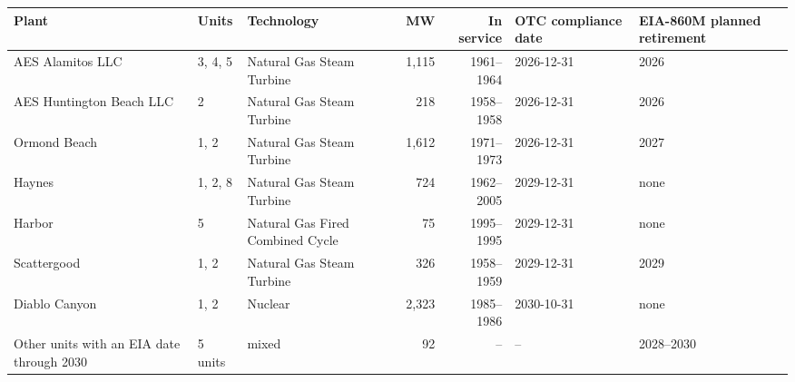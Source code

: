 \begin{tabular}{p{3.6cm}p{1.4cm}p{3.2cm}rrll}
\toprule
Plant & Units & Technology & MW & In service & OTC compliance date & EIA-860M planned retirement \\
\midrule
AES Alamitos LLC & 3, 4, 5 & Natural Gas Steam Turbine & 1,115 & 1961--1964 & 2026-12-31 & 2026 \\
AES Huntington Beach LLC & 2 & Natural Gas Steam Turbine & 218 & 1958--1958 & 2026-12-31 & 2026 \\
Ormond Beach & 1, 2 & Natural Gas Steam Turbine & 1,612 & 1971--1973 & 2026-12-31 & 2027 \\
Haynes & 1, 2, 8 & Natural Gas Steam Turbine & 724 & 1962--2005 & 2029-12-31 & none \\
Harbor & 5 & Natural Gas Fired Combined Cycle & 75 & 1995--1995 & 2029-12-31 & none \\
Scattergood & 1, 2 & Natural Gas Steam Turbine & 326 & 1958--1959 & 2029-12-31 & 2029 \\
Diablo Canyon & 1, 2 & Nuclear & 2,323 & 1985--1986 & 2030-10-31 & none \\
\midrule
Other units with an EIA date through 2030 & 5 units & mixed & 92 & -- & -- & 2028--2030 \\
\bottomrule
\end{tabular}